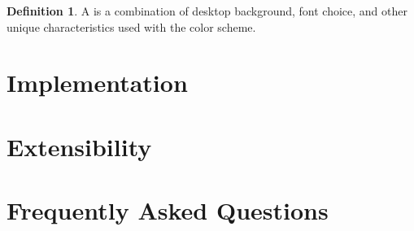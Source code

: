 \documentclass{article}
\theoremstyle{definition}
\newtheorem{definition}{Definition}
\begin{document}
    \begin{definition}
        A  is a combination of desktop background, font choice, and other unique characteristics used with the color scheme.
    \end{definition}

    \newpage


    \section{Implementation}

    \newpage


    \section{Extensibility}

    \newpage


    \section{Frequently Asked Questions}
\end{document}
